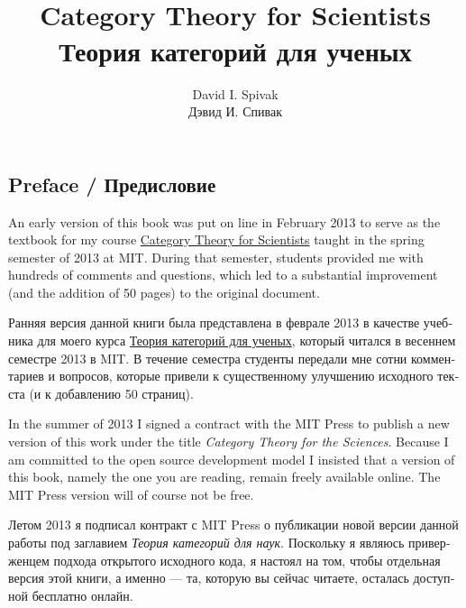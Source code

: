 \documentclass[a4paper]{book}
\title{~\\
    Category Theory for Scientists\\
    Теория категорий для ученых
  }
\author{
    David I. Spivak\\
    Дэвид И. Спивак
  }
\theoremstyle{myth}
\begin{document}
\begin{russian}
\maketitle


\chapter*{Preface / Предисловие}

An early version of this book was put on line in February 2013 to serve as the textbook for my course \href{http://math.mit.edu/~dspivak/teaching/sp13/}{\text Category Theory for Scientists} taught in the spring semester of 2013 at MIT. During that semester, students provided me with hundreds of comments and questions, which led to a substantial improvement (and the addition of 50 pages) to the original document.

Ранняя версия данной книги была представлена в феврале 2013 в качестве учебника для моего курса \href{http://math.mit.edu/~dspivak/teaching/sp13/}{\text Теория категорий для ученых},%
 который читался в весеннем семестре 2013 в MIT. В течение семестра студенты передали мне сотни комментариев и вопросов, которые привели к существенному улучшению исходного текста (и к добавлению 50 страниц).

In the summer of 2013 I signed a contract with the MIT Press to publish a new version of this work under the title {\em Category Theory for the Sciences}. Because I am committed to the open source development model I insisted that a version of this book, namely the one you are reading, remain freely available online. The MIT Press version will of course not be free.

Летом 2013 я подписал контракт с MIT Press о публикации новой версии данной работы под заглавием {\em Теория категорий для наук}. Поскольку я являюсь приверженцем подхода открытого исходного кода, я настоял на том, чтобы отдельная версия этой книги, а именно — та, которую вы сейчас читаете, осталась доступной бесплатно онлайн.%


\end{russian}
\end{document}
